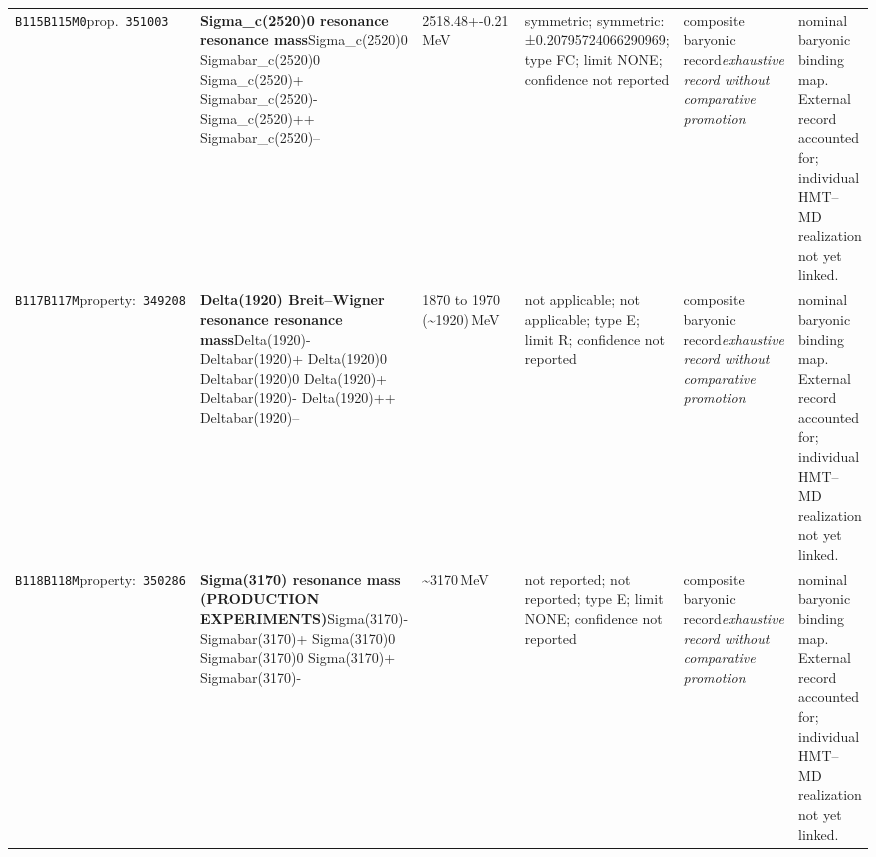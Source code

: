 \begin{landscape}
\begin{longtable}{L{1.85cm}L{4.45cm}L{2.35cm}L{4.05cm}L{3.35cm}L{7.15cm}}
\texttt{B115}\newline \texttt{B115M0}\newline prop.\ \texttt{351003} & \textbf{Sigma\_\allowbreak{}c(2520)0 resonance resonance mass}\newline Sigma\_\allowbreak{}c(2520)0 \textbar{}\allowbreak{} Sigmabar\_\allowbreak{}c(2520)0 \textbar{}\allowbreak{} Sigma\_\allowbreak{}c(2520)+ \textbar{}\allowbreak{} Sigmabar\_\allowbreak{}c(2520)- \textbar{}\allowbreak{} Sigma\_\allowbreak{}c(2520)++ \textbar{}\allowbreak{} Sigmabar\_\allowbreak{}c(2520)-- & 2518.48+-0.21\,MeV & symmetric; symmetric: ±0.20795724066290969; type FC; limit NONE; confidence not reported & composite baryonic record\newline \emph{exhaustive record without comparative promotion} & nominal baryonic binding map. External record accounted for; individual HMT--MD realization not yet linked. \\
\texttt{B117}\newline \texttt{B117M}\newline property:\ \texttt{349208} & \textbf{Delta(1920) Breit--Wigner resonance resonance mass}\newline Delta(1920)- \textbar{}\allowbreak{} Deltabar(1920)+ \textbar{}\allowbreak{} Delta(1920)0 \textbar{}\allowbreak{} Deltabar(1920)0 \textbar{}\allowbreak{} Delta(1920)+ \textbar{}\allowbreak{} Deltabar(1920)- \textbar{}\allowbreak{} Delta(1920)++ \textbar{}\allowbreak{} Deltabar(1920)-- & 1870 to 1970 (\textasciitilde{}1920)\,MeV & not applicable; not applicable; type E; limit R; confidence not reported & composite baryonic record\newline \emph{exhaustive record without comparative promotion} & nominal baryonic binding map. External record accounted for; individual HMT--MD realization not yet linked. \\
\texttt{B118}\newline \texttt{B118M}\newline property:\ \texttt{350286} & \textbf{Sigma(3170) resonance mass (PRODUCTION EXPERIMENTS)}\newline Sigma(3170)- \textbar{}\allowbreak{} Sigmabar(3170)+ \textbar{}\allowbreak{} Sigma(3170)0 \textbar{}\allowbreak{} Sigmabar(3170)0 \textbar{}\allowbreak{} Sigma(3170)+ \textbar{}\allowbreak{} Sigmabar(3170)- & \textasciitilde{}3170\,MeV & not reported; not reported; type E; limit NONE; confidence not reported & composite baryonic record\newline \emph{exhaustive record without comparative promotion} & nominal baryonic binding map. External record accounted for; individual HMT--MD realization not yet linked. \\

\end{longtable}
\end{landscape}
